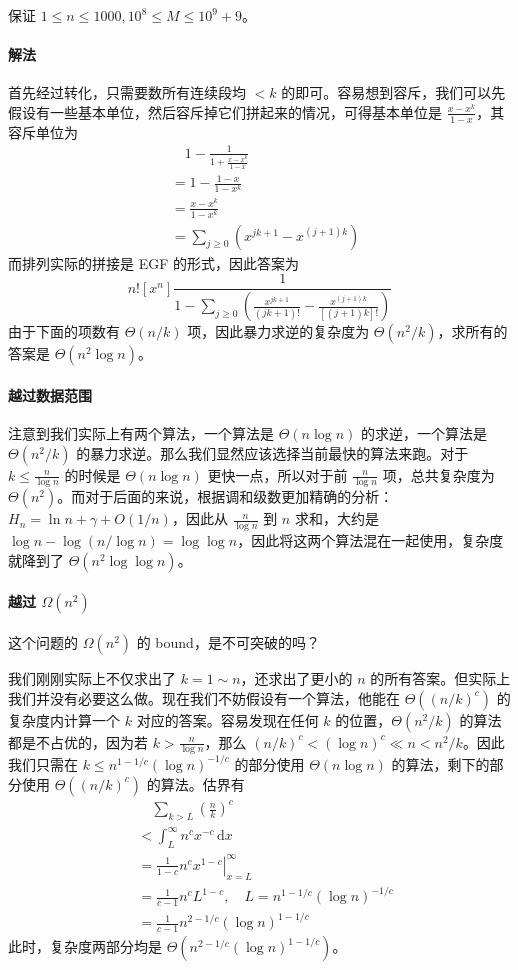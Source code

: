 \documentclass[12pt]{ctexart}
\theoremstyle{theorem}
\theoremstyle{theorem}
\begin{document}
保证 $1\le n\le 1000, 10^8\le M\le 10^9+9$。

\paragraph{解法}

首先经过转化，只需要数所有连续段均 $<k$ 的即可。容易想到容斥，我们可以先假设有一些基本单位，然后容斥掉它们拼起来的情况，可得基本单位是 $\frac{x-x^k}{1-x}$，其容斥单位为
\begin{align*}
&\quad 1-\frac 1{1+\frac{x-x^k}{1-x}}\\
&= 1-\frac{1-x}{1-x^k}\\
&= \frac{x-x^k}{1-x^k}\\
&= \sum_{j\ge 0} \left(x^{jk+1} - x^{(j+1)k}\right)
\end{align*}
而排列实际的拼接是 EGF 的形式，因此答案为
$$
n![x^n] \frac 1{\displaystyle1 - \sum_{j\ge 0} \left( \frac{x^{jk+1}}{(jk+1)!}  - \frac{x^{(j+1)k}}{[(j+1)k]!}\right)}
$$
由于下面的项数有 $\Theta(n/k)$ 项，因此暴力求逆的复杂度为 $\Theta(n^2/k)$，求所有的答案是 $\Theta(n^2\log n)$。

\paragraph{越过数据范围}

注意到我们实际上有两个算法，一个算法是 $\Theta(n\log n)$ 的求逆，一个算法是 $\Theta(n^2/k)$ 的暴力求逆。那么我们显然应该选择当前最快的算法来跑。对于 $k\le \frac n{\log n}$ 的时候是 $\Theta(n\log n)$ 更快一点，所以对于前 $\frac n{\log n}$ 项，总共复杂度为 $\Theta(n^2)$。而对于后面的来说，根据调和级数更加精确的分析：$H_n = \ln n + \gamma + O(1/n)$，因此从 $\frac n{\log n}$ 到 $n$ 求和，大约是 $\log n - \log(n/\log n) = \log\log n$，因此将这两个算法混在一起使用，复杂度就降到了 $\Theta(n^2\log\log n)$。

\paragraph{越过 $\Omega(n^2)$}

这个问题的 $\Omega(n^2)$ 的 bound，是不可突破的吗？

我们刚刚实际上不仅求出了 $k=1\sim n$，还求出了更小的 $n$ 的所有答案。但实际上我们并没有必要这么做。现在我们不妨假设有一个算法，他能在 $\Theta((n/k)^c)$ 的复杂度内计算一个 $k$ 对应的答案。容易发现在任何 $k$ 的位置，$\Theta(n^2/k)$ 的算法都是不占优的，因为若 $k>\frac n{\log n}$，那么 $(n/k)^c < (\log n)^c \ll n < n^2/k$。因此我们只需在 $k\le n^{1-1/c}(\log n)^{-1/c}$ 的部分使用 $\Theta(n\log n)$ 的算法，剩下的部分使用 $\Theta((n/k)^c)$ 的算法。估界有
\begin{align*}
&\quad \sum_{k>L} \left(\frac nk\right)^c\\
&< \int_L^\infty n^cx^{-c} \,\mathrm dx\\
&= \left.\frac 1{1-c}n^c x^{1-c}\right|_{x=L}^\infty\\
&= \frac 1{c-1}n^cL^{1-c},\quad L=n^{1-1/c}(\log n)^{-1/c}\\
&= \frac 1{c-1} n^{2-1/c}(\log n)^{1-1/c}
\end{align*}
此时，复杂度两部分均是 $\Theta(n^{2-1/c}(\log n)^{1-1/c})$。
\end{document}
